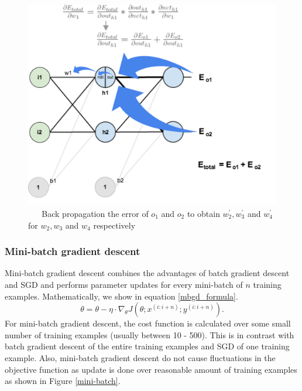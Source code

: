 \documentclass[master]{thesis-uestc}
\begin{document}
\begin{figure}[ht]
\includegraphics[width=5in]{pic/nn-calculation.png}
\caption{\,\,\,\,\,\,\,\,\,\,Back propagation the error of $o_1$ and $o_2$ to obtain $w_{2}^{\prime}, w_{3}^{\prime}$ and $w_{4}^{\prime}$ for $w_2, w_3$ and $w_4$ respectively}
\label{fig_nn-calculation}
\end{figure}

\subsubsection{Mini-batch gradient descent}
Mini-batch gradient descent combines the advantages of batch gradient descent and SGD and performs parameter updates for every mini-batch of $n$ training examples. Mathematically, we show in equation \ref{mbgd_formula}.
\begin{equation}
    \theta = \theta - \eta \cdot \nabla_\theta J(\theta; x^{(i:i+n)}; y^{(i:i+n)}).
\label{mbgd_formula}
\end{equation}
For mini-batch gradient descent, the cost function is calculated over some small number of training examples (usually between 10 - 500). This is in contrast with batch gradient descent of the entire training examples and SGD of one training example. Also, mini-batch gradient descent do not cause fluctuations in the objective function as update is done over reasonable amount of training examples as shown in Figure \ref{mini-batch}.
\end{document}
